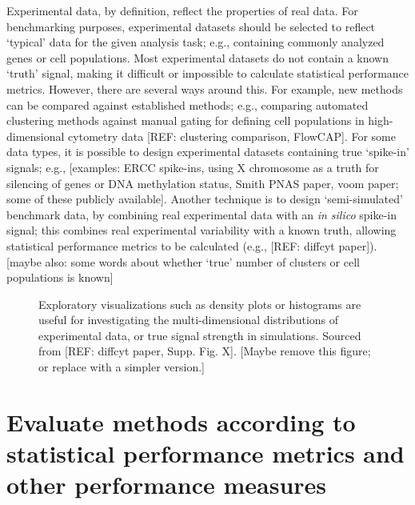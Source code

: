\documentclass[12pt, a4paper]{article}
\begin{document}
Experimental data, by definition, reflect the properties of real data. For benchmarking purposes, experimental datasets should be selected to reflect `typical' data for the given analysis task; e.g., containing commonly analyzed genes or cell populations. Most experimental datasets do not contain a known `truth' signal, making it difficult or impossible to calculate statistical performance metrics. However, there are several ways around this. For example, new methods can be compared against established methods; e.g., comparing automated clustering methods against manual gating for defining cell populations in high-dimensional cytometry data [REF: clustering comparison, FlowCAP]. For some data types, it is possible to design experimental datasets containing true `spike-in' signals; e.g., [examples: ERCC spike-ins, using X chromosome as a truth for silencing of genes or DNA methylation status, Smith PNAS paper, voom paper; some of these publicly available]. Another technique is to design `semi-simulated' benchmark data, by combining real experimental data with an \textit{in silico} spike-in signal; this combines real experimental variability with a known truth, allowing statistical performance metrics to be calculated (e.g., [REF: diffcyt paper]). [maybe also: some words about whether `true' number of clusters or cell populations is known]



\vskip 5mm

\begin{figure}[H]
\begin{center}
\end{center}
\caption{Exploratory visualizations such as density plots or histograms are useful for investigating the multi-dimensional distributions of experimental data, or true signal strength in simulations. Sourced from [REF: diffcyt paper, Supp. Fig. X]. [Maybe remove this figure; or replace with a simpler version.]}
\label{fig:data_distributions}
\end{figure}




\section{Evaluate methods according to statistical performance metrics and other performance measures}
\end{document}
